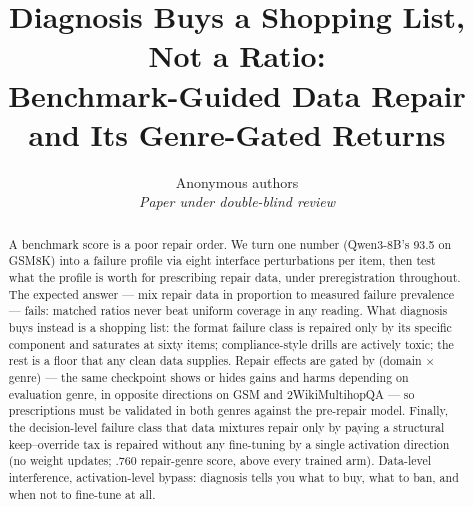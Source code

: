 \documentclass{article}
\title{Diagnosis Buys a Shopping List, Not a Ratio:\\
Benchmark-Guided Data Repair and Its Genre-Gated Returns}
\author{Anonymous authors\\
\textit{Paper under double-blind review}}
\begin{document}
\maketitle

\begin{abstract}
A benchmark score is a poor repair order. We turn one number (Qwen3-8B's 93.5
on GSM8K) into a failure profile via eight interface perturbations per item,
then test what the profile is worth for prescribing repair data, under
preregistration throughout. The expected answer --- mix repair data in
proportion to measured failure prevalence --- fails: matched ratios never beat
uniform coverage in any reading. What diagnosis buys instead is a shopping
list: the format failure class is repaired only by its specific component and
saturates at sixty items; compliance-style drills are actively toxic; the rest
is a floor that any clean data supplies. Repair effects are gated by (domain
$\times$ genre) --- the same checkpoint shows or hides gains and harms
depending on evaluation genre, in opposite directions on GSM and
2WikiMultihopQA --- so prescriptions must be validated in both genres against
the pre-repair model. Finally, the decision-level failure class that data
mixtures repair only by paying a structural keep--override tax is repaired without
any fine-tuning by a single activation direction (no weight updates; .760 repair-genre score,
above every trained arm). Data-level interference, activation-level bypass:
diagnosis tells you what to buy, what to ban, and when not to fine-tune at all.
\end{abstract}















\appendix



\end{document}
